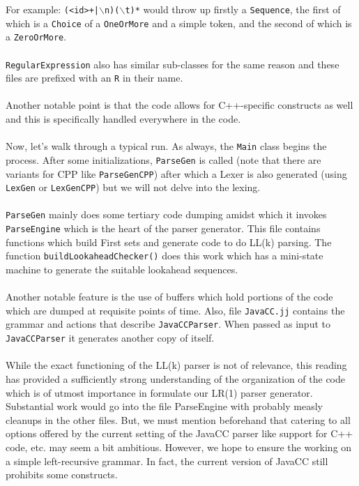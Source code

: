 \documentclass{article}
\begin{document}
\noindent For example: \texttt{(<id>+|$\backslash$n)($\backslash$t)*} would throw up firstly a \texttt{Sequence}, the first of which is a \texttt{Choice} of a \texttt{OneOrMore} and a simple token, and the second of which is a \texttt{ZeroOrMore}.\\\\\texttt{RegularExpression} also has similar sub-classes for the same reason and these files are prefixed with an \texttt{R} in their name.\\\\Another notable point is that the code allows for C++-specific constructs as well and this is specifically handled everywhere in the code.\\\\Now, let's walk through a typical run. As always, the \texttt{Main} class begins the process. After some initializations, \texttt{ParseGen} is called (note that there are variants for CPP like \texttt{ParseGenCPP}) after which a Lexer is also generated (using \texttt{LexGen} or \texttt{LexGenCPP}) but we will not delve into the lexing.\\\\\texttt{ParseGen} mainly does some tertiary code dumping amidst which it invokes \texttt{ParseEngine} which is the heart of the parser generator. This file contains functions which build First sets and generate code to do LL(k) parsing. The function \texttt{buildLookaheadChecker()} does this work which has a mini-state machine to generate the suitable lookahead sequences.\\\\Another notable feature is the use of buffers which hold portions of the code which are dumped at requisite points of time. Also, file \texttt{JavaCC.jj} contains the grammar and actions that describe \texttt{JavaCCParser}. When passed as input to \texttt{JavaCCParser} it generates another copy of itself.\\\\While the exact functioning of the LL(k) parser is not of relevance, this reading has provided a sufficiently strong understanding of the organization of the code which is of utmost importance in formulate our LR(1) parser generator. Substantial work would go into the file ParseEngine with probably measly cleanups in the other files. But, we must mention beforehand that catering to all options offered by the current setting of the JavaCC parser like support for C++ code, etc. may seem a bit ambitious. However, we hope to ensure the working on a simple left-recursive grammar. In fact, the current version of JavaCC still prohibits some constructs.
\end{document}
